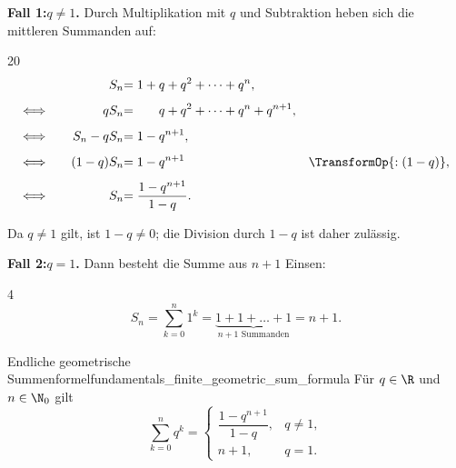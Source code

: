 \begin{enumerate}[label=\textbf{\arabic*.},leftmargin=2.3em,itemsep=1.2em]
\begin{minipage}{\linewidth}
      \textbf{Fall 1:\enspace $q\neq1$.}\quad
      Durch Multiplikation mit $q$ und Subtraktion heben sich die mittleren
      Summanden auf:
      \begin{ClozeArea}[33]{20}
        \[
          \begin{array}{c@{\qquad}r@{}l@{\quad}l}
            \phantom{\Longleftrightarrow}
              & \displaystyle S_n
              & \displaystyle =1+q+q^2+\dots+q^n,
              & \\[0.8em]
            \Longleftrightarrow
              & \displaystyle qS_n
              & \displaystyle =\phantom{1+{}}q+q^2+\dots+q^n+q^{n+1},
              & \\[0.8em]
            \Longleftrightarrow
              & \displaystyle S_n-qS_n
              & \displaystyle =1-q^{n+1},
              & \\[0.8em]
            \Longleftrightarrow
              & \displaystyle (1-q)S_n
              & \displaystyle =1-q^{n+1}
              & \displaystyle \TransformOp{:(1-q)}, \\[0.8em]
            \Longleftrightarrow
              & \displaystyle S_n
              & \displaystyle =\frac{1-q^{n+1}}{1-q}.
              &
          \end{array}
        \]
      \end{ClozeArea}
      Da $q\neq1$ gilt, ist $1-q\neq0$; die Division durch $1-q$ ist daher
      zulässig.
    \end{minipage}

    \medskip
    \begin{minipage}{\linewidth}
      \textbf{Fall 2:\enspace $q=1$.}\quad
      Dann besteht die Summe aus $n+1$ Einsen:
      \begin{ClozeArea}[33]{4}
        \[
          S_n=\sum_{k=0}^{n}1^k
            =\underbrace{1+1+\dots+1}_{n+1\text{ Summanden}}
            =n+1.
        \]
      \end{ClozeArea}
    \end{minipage}

    \begin{TheoremBox}{Endliche geometrische Summenformel}{fundamentals_finite_geometric_sum_formula}
      Für $q\in\R$ und $n\in\N_0$ gilt
      \[
        \sum_{k=0}^{n}q^k
        =
        \begin{cases}
          \dfrac{1-q^{n+1}}{1-q}, & q\neq1,\\[0.8em]
          n+1, & q=1.
        \end{cases}
      \]
    \end{TheoremBox}
\end{enumerate}
